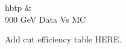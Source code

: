 \begin{2figures}{hbtp}
   &
   \\
\caption{900 GeV Data Vs MC}
 \label{fig:ecal_noise_1}
\end{2figures}

Add cut efficiency table HERE.

